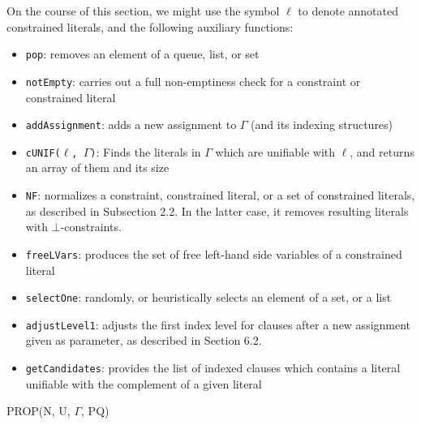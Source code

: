 \documentclass[a4paper]{article}
\begin{document}
On the course of this section, we might use the symbol $\ell$ to denote annotated constrained literals, and the following 
auxiliary functions:
\begin{itemize}
	\item \texttt{pop}: removes an element of a queue, list, or set
	\item \texttt{notEmpty}: carries out a full non-emptiness check for a constraint or constrained literal
	\item \texttt{addAssignment}: adds a new assignment to $\Gamma$ (and its indexing structures)
	\item \texttt{cUNIF($\ell$, $\Gamma$)}: Finds the literals in $\Gamma$ which are unifiable with $\ell$, and returns an array of them and its size
	\item \texttt{NF}: normalizes a constraint, constrained literal, or a set of constrained literals, as described in Subsection 2.2. In the latter case, it removes resulting literals with $\bot$-constraints.
	\item \texttt{freeLVars}: produces the set of free left-hand side variables of a constrained literal
	\item \texttt{selectOne}: randomly, or heuristically selects an element of a set, or a list
	\item \texttt{adjustLevel1}: adjusts the first index level for clauses after a new assignment given as parameter, as described in Section 6.2.
	\item \texttt{getCandidates}: provides the list of indexed clauses which contains a literal unifiable with the complement of a given literal
\end{itemize}
\begin{function}
	
	\caption{PROP(N, U, $\Gamma$, PQ)}
	\;
\end{function}
\end{document}
